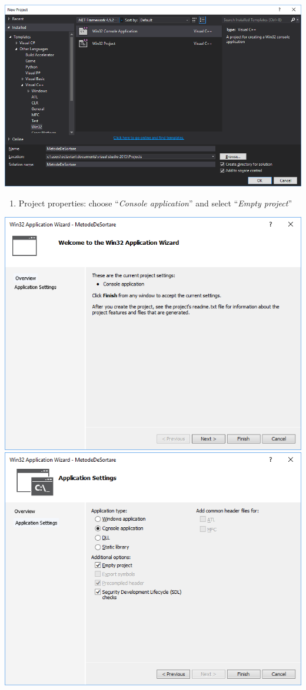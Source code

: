 \documentclass[../en-fa-lab.tex]{subfiles}
\begin{document}
\includegraphics[width=\textwidth]{../Resources/lab0/image1.png}

\begin{enumerate}
\def\labelenumi{\arabic{enumi}.}
\setcounter{enumi}{2}
\item
  Project properties: choose ``\emph{Console application}'' and select
  ``\emph{Empty project}''
\end{enumerate}

\includegraphics[width=\textwidth]{../Resources/lab0/image2.png}
\includegraphics[width=\textwidth]{../Resources/lab0/image3.png}
\end{document}
